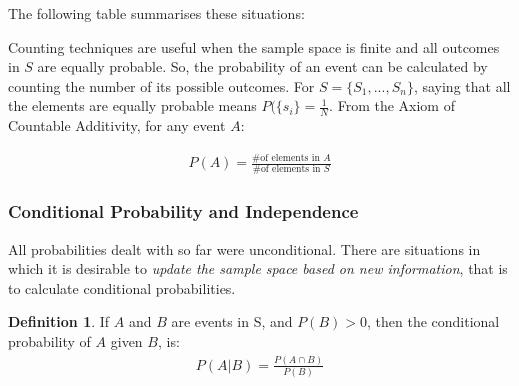 \documentclass[
  oneside,
  11pt, a4paper,
  footinclude=true,
  headinclude=true,
  cleardoublepage=empty
]{scrbook}
\theoremstyle{definition}
\newtheorem{definition}{Definition}[section]
\theoremstyle{definition}
\begin{document}
        The following table summarises these situations:
        \begin{table}[h]
            \centering
            \caption{Number of possible arrangements of size $r$ from $n$ objects}
            \label{tab:my-table}
        \end{table}
        
        Counting techniques are useful when the sample space is finite and all outcomes in $S$ are equally probable. So, the probability of an event can be calculated by counting the number of its possible outcomes. For $S = \{S_1, ..., S_n\}$, saying that all the elements are equally probable means $P(\{s_i\} = \frac{1}{N}$. From the Axiom of Countable Additivity, for any event $A$:
        
        \begin{align*}
            P(A) = \frac{\text{\# of elements in $A$}}{\text{\# of elements in $S$}}
        \end{align*}{}
        
        \subsubsection{Conditional Probability and Independence}
        
        All probabilities dealt with so far were unconditional. There are situations in which it is desirable to \emph{update the sample space based on new information}, that is to calculate conditional probabilities.
        
        \begin{definition}{If $A$ and $B$ are events in S, and $P(B) > 0$, then the conditional probability of $A$ given $B$, is:}
            \begin{align}\label{d-2-1-6}
                P(A|B) = \frac{P(A \cap B)}{P(B)}
            \end{align}{}
        \end{definition}{}
        
\end{document}
